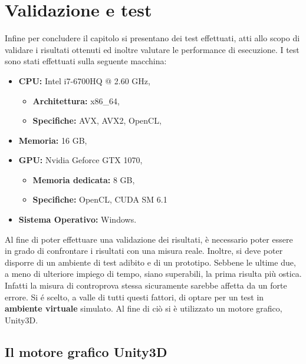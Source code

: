 \section{Validazione e test}
\label{sec:test}
Infine per concludere il capitolo si presentano dei test effettuati, atti allo scopo di validare i risultati ottenuti ed inoltre valutare le performance di esecuzione. I test sono stati effettuati sulla seguente macchina:
\begin{itemize}
	\item \textbf{CPU:} Intel i7-6700HQ @ 2.60 GHz,
	\begin{itemize}
		\item \textbf{Architettura:} x86\_64, 
		\item \textbf{Specifiche:} AVX, AVX2, OpenCL,
	\end{itemize}		
	\item \textbf{Memoria:} 16 GB, 
	\item \textbf{GPU:} Nvidia Geforce GTX 1070,
	\begin{itemize}
		\item \textbf{Memoria dedicata:} 8 GB, 
		\item \textbf{Specifiche:} OpenCL, CUDA SM 6.1
	\end{itemize}			
	\item \textbf{Sistema Operativo:}  Windows.	 
\end{itemize}

Al fine di poter effettuare una validazione dei risultati, è necessario poter essere in grado di confrontare i risultati con una misura reale. Inoltre, si deve poter disporre di un ambiente di test adibito e di un prototipo. Sebbene le ultime due, a meno di ulteriore impiego di tempo, siano superabili, la prima risulta più ostica. Infatti la misura di controprova stessa sicuramente sarebbe affetta da un forte errore. Si é scelto, a valle di tutti questi fattori, di optare per un test in \textbf{ambiente virtuale} simulato. Al fine di ciò si è utilizzato un motore grafico, Unity3D. 
\subsection{Il motore grafico Unity3D}
\label{sec:unity}

